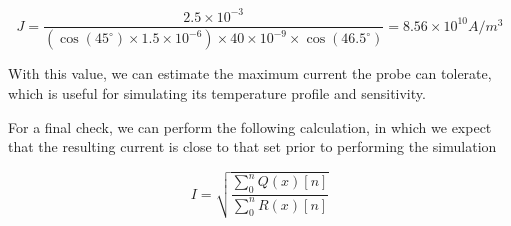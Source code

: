 \documentclass[]{report}
\begin{document}
\begin{equation}
J=\frac{2.5\times10^{-3}}{(\cos(45^{\circ})\times 1.5\times 10^{-6})\times 40\times 10^{-9}\times \cos(46.5^{\circ})} = 8.56\times10^{10}A/m^3
\end{equation}

With this value, we can estimate the maximum current the probe can tolerate, which is useful for simulating its temperature profile and sensitivity.

For a final check, we can perform the following calculation, in which we expect that the resulting current is close to that set prior to performing the simulation

\begin{equation}
I = \sqrt{\frac{\sum_{0}^{n} Q(x)[n]}{\sum_{0}^{n} R(x)[n]}}
\end{equation}
\end{document}
